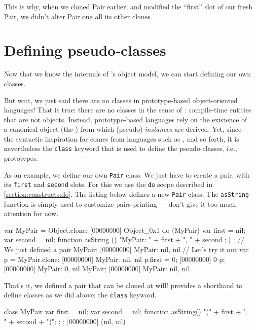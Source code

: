 This is why, when we cloned Pair earlier, and modified the ``first''
slot of our fresh Pair, we didn't alter Pair one all its other clones.

\section{Defining pseudo-classes}
\label{sec:tut:class}

Now that we know the internals of \us's object model, we can start
defining our own classes.

But wait, we just said there are no classes in prototype-based
object-oriented languages!  That is true: there are no classes in the
sense of \Cxx: compile-time entities that are not objects.  Instead,
prototype-based languages rely on the existence of a canonical object
(the ) from which (pseudo) \emph{instances} are
derived.  Yet, since the syntactic inspiration for \us comes from
languages such as \java, \Cxx and so forth, it is nevertheless the
\lstinline|class| keyword that is used to define the pseudo-classes,
i.e., prototypes.

As an example, we define our own \lstinline{Pair} class. We just have
to create a pair, with its \lstinline|first| and \lstinline|second|
slots. For this we use the \lstinline{do} scope described in
\autoref{section:constructs:do}. The listing below defines a new
\lstinline{Pair} class. The \lstinline{asString} function is simply
used to customize pairs printing --- don't give it too much attention
for now.

\begin{urbiscript}[firstnumber=1]
var MyPair = Object.clone;
[00000000] Object_0x1
do (MyPair)
{
  var first = nil;
  var second = nil;
  function asString ()
  {
    "MyPair: " + first + ", " + second
  };
} | {};
// We just defined a pair
MyPair;
[00000000] MyPair: nil, nil
// Let's try it out
var p = MyPair.clone;
[00000000] MyPair: nil, nil
p.first = 0;
[00000000] 0
p;
[00000000] MyPair: 0, nil
MyPair;
[00000000] MyPair: nil, nil
\end{urbiscript}

That's it, we defined a pair that can be cloned at will! \us
provides a shorthand to define classes as we did above: the
\lstinline{class} keyword.

\begin{urbiscript}[firstnumber=1]
class MyPair
{
  var first = nil;
  var second = nil;
  function asString() { "(" + first + ", " + second + ")"; };
};
[00000000] (nil, nil)
\end{urbiscript}

